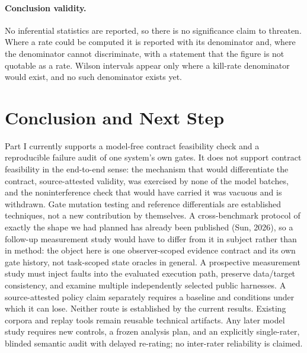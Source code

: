 \documentclass[11pt]{article}
\begin{document}
\paragraph{Conclusion validity.} No inferential statistics are reported, so there is no significance claim to threaten. Where a rate could be computed it is reported with its denominator and, where the denominator cannot discriminate, with a statement that the figure is not quotable as a rate. Wilson intervals appear only where a kill-rate denominator would exist, and no such denominator exists yet.

\section{Conclusion and Next Step}
Part I currently supports a model-free contract feasibility check and a reproducible failure audit of one system's own gates. It does not support contract feasibility in the end-to-end sense: the mechanism that would differentiate the contract, source-attested validity, was exercised by none of the model batches, and the noninterference check that would have carried it was vacuous and is withdrawn. Gate mutation testing and reference differentials are established techniques, not a new contribution by themselves. A cross-benchmark protocol of exactly the shape we had planned has already been published (Sun, 2026), so a follow-up measurement study would have to differ from it in subject rather than in method: the object here is one observer-scoped evidence contract and its own gate history, not task-scoped state oracles in general. A prospective measurement study must inject faults into the evaluated execution path, preserve data/target consistency, and examine multiple independently selected public harnesses. A source-attested policy claim separately requires a baseline and conditions under which it can lose. Neither route is established by the current results. Existing corpora and replay tools remain reusable technical artifacts. Any later model study requires new controls, a frozen analysis plan, and an explicitly single-rater, blinded semantic audit with delayed re-rating; no inter-rater reliability is claimed.
\end{document}

